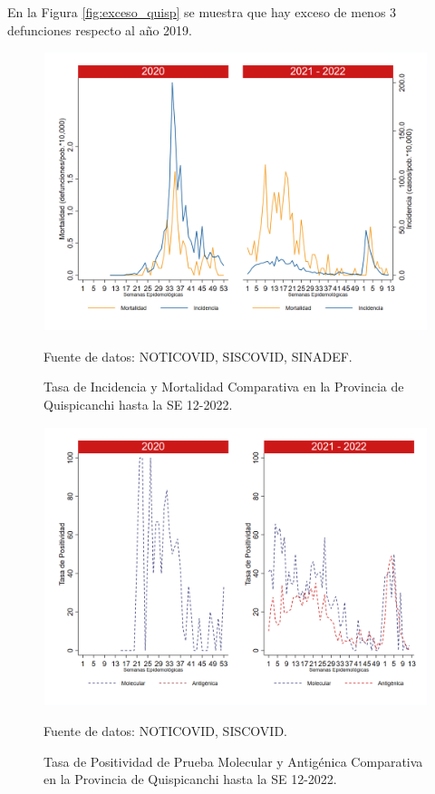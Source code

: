 \documentclass[12pt,a4paper,openany]{book}
\begin{document}
	En la Figura \ref{fig:exceso_quisp} se muestra que hay exceso de menos 3 defunciones respecto al año 2019.
		
		\begin{figure}[h]
			\caption{Tasa de Incidencia y Mortalidad Comparativa en la Provincia de Quispicanchi hasta la SE 12-2022.}\label{fig:inc_mort_quisp}
			\begin{center}
				\includegraphics[width=0.85\linewidth]{../figuras/incidencia_mortalidad_20_21_12.png}
			\end{center}
			{\footnotesize {Fuente de datos: NOTICOVID, SISCOVID, SINADEF.}}
		\end{figure}
		
		\begin{figure}[h]
			\caption{Tasa de Positividad de Prueba Molecular y Antigénica Comparativa en la Provincia de Quispicanchi hasta la SE 12-2022.}\label{fig:positividad_quisp}
			\begin{center}
				\includegraphics[width=0.7\linewidth]{../figuras/positividad_20_21_12.png}
			\end{center}
			{\footnotesize {Fuente de datos: NOTICOVID, SISCOVID.}}
		\end{figure}
		
\end{document}
